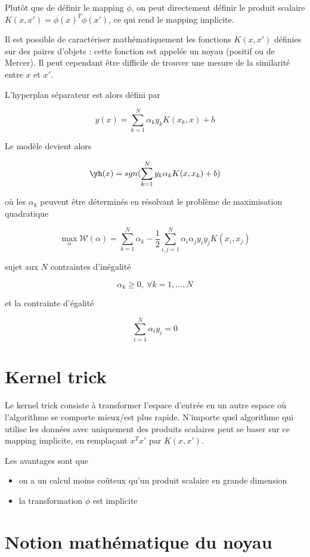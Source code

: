 Plutôt que de définir le mapping $\phi$, on peut directement définir le produit scalaire $K(x, x') = \phi(x)^T \phi(x')$, ce qui rend le mapping implicite.

Il est possible de caractériser mathématiquement les fonctions $K(x, x')$ définies sur des paires d'objets : cette fonction est appelée un noyau (positif ou de Mercer). Il peut cependant être difficile de trouver une mesure de la similarité entre $x$ et $x'$.

L'hyperplan séparateur est alors défini par

$$y(x) = \sum_{k = 1}^N \alpha_k y_k K(x_k, x) + b$$

Le modèle devient alors

$$\yh(x) = sgn(\sum_{k = 1}^N y_k \alpha_k K(x, x_k) + b)$$

où les $\alpha_k$ peuvent être déterminés en résolvant le problème de maximisation quadratique 

$$\max_\alpha \mathcal{W}(\alpha) = \sum_{k = 1}^N \alpha_k - \frac{1}{2} \sum_{i, j = 1}^N \alpha_i \alpha_j y_i y_j K(x_i, x_j)$$

sujet aux $N$ contraintes d'inégalité

$$\alpha_k \geq 0, \: \forall k = 1, \dots , N$$

et la contrainte d'égalité

$$\sum_{i = 1}^N \alpha_i y_i = 0$$

\section{Kernel trick}

Le kernel trick consiste à transformer l'espace d'entrée en un autre espace où l'algorithme se comporte mieux/est plus rapide. N'importe quel algorithme qui utilise les données avec uniquement des produits scalaires peut se baser sur ce mapping implicite, en remplaçant $x^Tx'$ par $K(x, x')$. 

Les avantages sont que

\begin{itemize}
	\item on a un calcul moins coûteux qu'un produit scalaire en grande dimension
	\item la transformation $\phi$ est implicite
\end{itemize}

\section{Notion mathématique du noyau}

